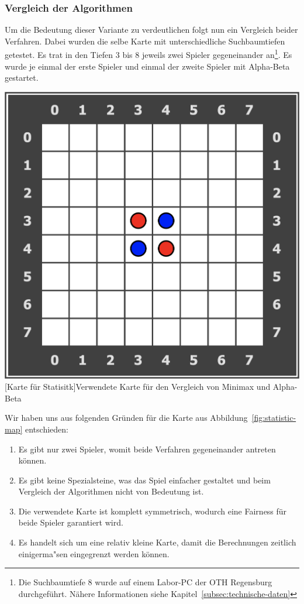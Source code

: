\subsubsection{Vergleich der Algorithmen}\label{subsubsec:vergleich-der-algorithmen}
Um die Bedeutung dieser Variante zu verdeutlichen folgt nun ein Vergleich beider Verfahren.
Dabei wurden die selbe Karte mit unterschiedliche Suchbaumtiefen getestet.
Es trat in den Tiefen 3 bis 8 jeweils zwei Spieler gegeneinander an\footnote{Die Suchbaumtiefe 8 wurde auf einem Labor-PC der OTH Regensburg durchgef\"uhrt. N\"ahere Informationen siehe Kapitel~\ref{subsec:technische-daten}}.
Es wurde je einmal der erste Spieler und einmal der zweite Spieler mit Alpha-Beta gestartet.

\vspace{1em}
\begin{minipage}{\linewidth}
    \centering
    \includegraphics[width=0.3\linewidth]{pics/statistic-map}
    [Karte für Statisitk]{Verwendete Karte für den Vergleich von Minimax und Alpha-Beta}
    \label{fig:statistic-map}
\end{minipage}

Wir haben uns aus folgenden Gr\"unden f\"ur die Karte aus Abbildung~\ref{fig:statistic-map} entschieden:
\begin{enumerate}
    \item Es gibt nur zwei Spieler, womit beide Verfahren gegeneinander antreten k\"onnen.
    \item Es gibt keine Spezialsteine, was das Spiel einfacher gestaltet und beim Vergleich der Algorithmen nicht von Bedeutung ist.
    \item Die verwendete Karte ist komplett symmetrisch, wodurch eine Fairness f\"ur beide Spieler garantiert wird.
    \item Es handelt sich um eine relativ kleine Karte, damit die Berechnungen zeitlich einigerma"sen eingegrenzt werden k\"onnen.
\end{enumerate}

